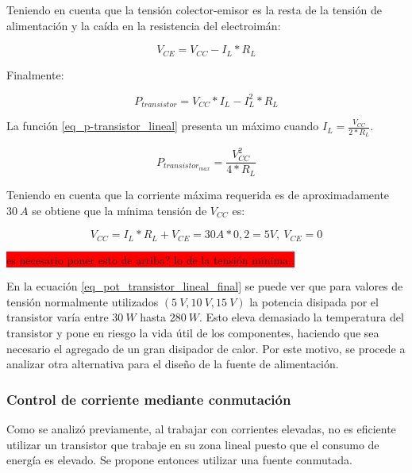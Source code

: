 Teniendo en cuenta que la tensión colector-emisor es la resta de la tensión de alimentación y la caída en la resistencia del electroimán:

\begin{equation}
	V_{CE}=V_{CC}-I_L*R_L
\end{equation}

Finalmente:

\begin{equation}
	P_{transistor}=V_{CC}*I_L-I_L^2*R_L
	\label{eq_p-transistor_lineal}
\end{equation}

La función \ref{eq_p-transistor_lineal} presenta un máximo cuando $I_L=\frac{V_{CC}}{2*R_L}$.


\begin{equation}\label{eq_pot_transistor_lineal_final}
	P_{transistor_{max}}=\frac{V_{CC}^2}{4*R_L}
\end{equation}


Teniendo en cuenta que la corriente máxima requerida es de aproximadamente $30\:A$ se obtiene que la mínima tensión de $V_{CC}$ es:

\begin{equation}\label{eq_vcc-min}
	V_{CC}=I_L*R_L+V_{CE}=30 A * 0,2  = 5 V, \:V_{CE}=0
\end{equation}

\colorbox{red}{es necesario poner esto de arriba? lo de la tensión mínima..}

En la ecuación \ref{eq_pot_transistor_lineal_final} se puede ver que para valores de tensión normalmente utilizados $(5\:V,10\:V,15\:V)$ la potencia disipada por el transistor varía entre $30\:W$ hasta $280\:W$. Esto eleva demasiado la temperatura del transistor y pone en riesgo la vida útil de los componentes, haciendo que sea necesario el agregado de un gran disipador de calor. Por este motivo, se procede a analizar otra alternativa para el diseño de la fuente de alimentación.

\subsubsection{Control de corriente mediante conmutación}

Como se analizó previamente, al trabajar con corrientes elevadas, no es eficiente utilizar un transistor que trabaje en su zona lineal puesto que el consumo de energía es elevado. Se propone entonces utilizar una fuente conmutada.


